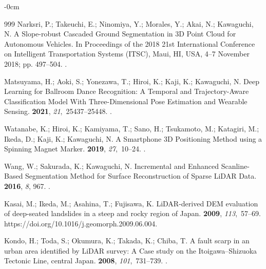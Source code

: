 \documentclass[land,article,accept,pdftex,moreauthors]{Definitions/mdpi}
\begin{document}
\begin{adjustwidth}{-\extralength}{0cm}
\begin{thebibliography}{999}
Narksri, P.; Takeuchi, E.; Ninomiya, Y.; Morales, Y.; Akai, N.; Kawaguchi, N.
\newblock A Slope-robust Cascaded Ground Segmentation in 3D Point Cloud for
  Autonomous Vehicles.
\newblock In Proceedings of the 2018 21st International Conference on
  Intelligent Transportation Systems (ITSC),   Maui, HI, USA, 4--7 November 2018; pp. 497--504.
.

Matsuyama, H.; Aoki, S.; Yonezawa, T.; Hiroi, K.; Kaji, K.; Kawaguchi, N.
\newblock Deep Learning for Ballroom Dance Recognition: A Temporal and
  Trajectory-Aware Classification Model With Three-Dimensional Pose Estimation
  and Wearable Sensing.
 {\bf 2021}, {\em 21},~25437--25448.
.

Watanabe, K.; Hiroi, K.; Kamiyama, T.; Sano, H.; Tsukamoto, M.; Katagiri, M.;
  Ikeda, D.; Kaji, K.; Kawaguchi, N.
\newblock A Smartphone 3D Positioning Method using a Spinning Magnet Marker.
 {\bf 2019}, {\em 27},~10--24.
.

Wang, W.; Sakurada, K.; Kawaguchi, N.
\newblock Incremental and Enhanced Scanline-Based Segmentation Method for
  Surface Reconstruction of Sparse LiDAR Data.
 {\bf 2016}, {\em 8}, 967.
.

Kasai, M.; Ikeda, M.; Asahina, T.; Fujisawa, K.
\newblock LiDAR-derived DEM evaluation of deep-seated landslides in a steep and
  rocky region of Japan.
 {\bf 2009}, {\em 113},~57--69.
  {{https://doi.org/10.1016/j.geomorph.2009.06.004}}.

Kondo, H.; Toda, S.; Okumura, K.; Takada, K.; Chiba, T.
\newblock A fault scarp in an urban area identified by LiDAR survey: A Case
  study on the Itoigawa–Shizuoka Tectonic Line, central Japan.
 {\bf 2008}, {\em 101},~731--739.\linebreak
{}.


\end{thebibliography}
\end{adjustwidth}
\end{document}
